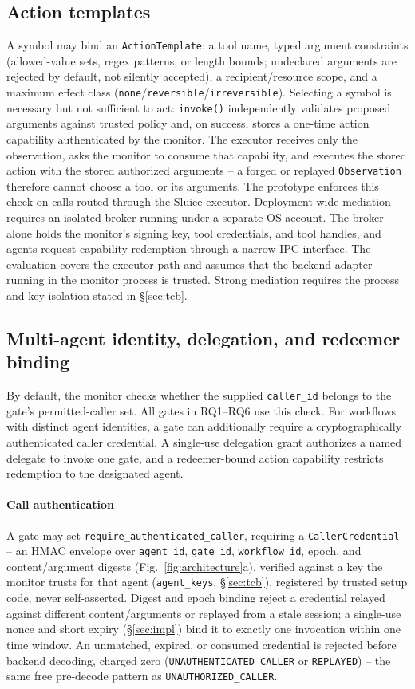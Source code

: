 \documentclass[conference,compsoc]{IEEEtran}
\begin{document}
\subsection{Action templates}
A symbol may bind an \texttt{ActionTemplate}: a tool name, typed
argument constraints (allowed-value sets, regex patterns, or length
bounds; undeclared arguments are rejected by default, not silently
accepted), a recipient/resource scope, and a maximum effect class
(\texttt{none}/\texttt{reversible}/\texttt{irreversible}). Selecting a
symbol is necessary but not sufficient to act: \texttt{invoke()}
independently validates proposed arguments against trusted policy and,
on success, stores a one-time action capability authenticated by the
monitor. The executor receives only the observation, asks the monitor
to consume that capability, and executes the stored action with the
stored authorized arguments -- a forged or replayed
\texttt{Observation} therefore cannot choose a tool or its arguments.
The prototype enforces this check on calls routed through the Sluice executor. Deployment-wide mediation requires an isolated broker running under a separate OS account. The broker alone holds the monitor's signing key, tool credentials, and tool handles, and agents request capability redemption through a narrow IPC interface. The evaluation covers the executor path and assumes that the backend adapter running in the monitor process is trusted.
Strong mediation requires the process and key isolation stated in
\S\ref{sec:tcb}.

\subsection{Multi-agent identity, delegation, and redeemer binding}
\label{sec:multiagent}
{By default, the monitor checks whether the supplied
\texttt{caller\_id} belongs to the gate's permitted-caller set.
All gates in RQ1--RQ6 use this check. For workflows with distinct
agent identities, a gate can additionally require a cryptographically
authenticated caller credential. A single-use delegation grant
authorizes a named delegate to invoke one gate, and a redeemer-bound
action capability restricts redemption to the designated agent.}

\paragraph{Call authentication} A gate may set
\texttt{require\_authenticated\_caller}, requiring a
\texttt{CallerCredential} -- an HMAC envelope over \texttt{agent\_id},
\texttt{gate\_id}, \texttt{workflow\_id}, epoch, and content/argument
digests (Fig.~\ref{fig:architecture}a), verified against a key the
monitor trusts for that agent (\texttt{agent\_keys}, \S\ref{sec:tcb}),
registered by trusted setup code, never self-asserted. Digest and epoch
binding reject a credential relayed against different content/arguments
or replayed from a stale session; a single-use nonce and short expiry
(\S\ref{sec:impl}) bind it to exactly one invocation within one time
window. An unmatched, expired, or consumed credential is rejected
before backend decoding, charged zero (\texttt{UNAUTHENTICATED\_CALLER}
or \texttt{REPLAYED}) -- the same free pre-decode pattern as
\texttt{UNAUTHORIZED\_CALLER}.
\end{document}
